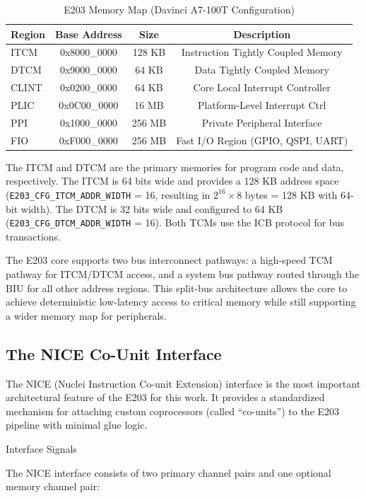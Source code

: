 \begin{table}[htbp]
\centering
\caption{E203 Memory Map (Davinci A7-100T Configuration)}
\label{tab:2_2}
\begin{tabular}{lccc}
\hline
Region & Base Address & Size & Description \\ \hline\hline
ITCM & 0x8000\_0000 & 128 KB & Instruction Tightly Coupled Memory \\ \hline
DTCM & 0x9000\_0000 & 64 KB & Data Tightly Coupled Memory \\ \hline
CLINT & 0x0200\_0000 & 64 KB & Core Local Interrupt Controller \\ \hline
PLIC & 0x0C00\_0000 & 16 MB & Platform-Level Interrupt Ctrl \\ \hline
PPI & 0x1000\_0000 & 256 MB & Private Peripheral Interface \\ \hline
FIO & 0xF000\_0000 & 256 MB & Fast I/O Region (GPIO, QSPI, UART) \\ \hline
\end{tabular}
\end{table}

The ITCM and DTCM are the primary memories for program code and data, respectively. The ITCM is 64 bits wide and provides a 128 KB address space (\texttt{E203\_CFG\_ITCM\_\-ADDR\_\-WIDTH} = 16, resulting in $2^{16} \times 8$ bytes = 128 KB with 64-bit width). The DTCM is 32 bits wide and configured to 64 KB (\texttt{E203\_CFG\_DTCM\_\-ADDR\_\-WIDTH} = 16). Both TCMs use the ICB protocol for bus transactions.


The E203 core supports two bus interconnect pathways: a high-speed TCM pathway for ITCM/DTCM access, and a system bus pathway routed through the BIU for all other address regions. This split-bus architecture allows the core to achieve deterministic low-latency access to critical memory while still supporting a wider memory map for peripherals.


\subsection{The NICE Co-Unit Interface}

The NICE (Nuclei Instruction Co-unit Extension) interface is the most important architectural feature of the E203 for this work. It provides a standardized mechanism for attaching custom coprocessors (called “co-units”) to the E203 pipeline with minimal glue logic.


Interface Signals


The NICE interface consists of two primary channel pairs and one optional memory channel pair:


